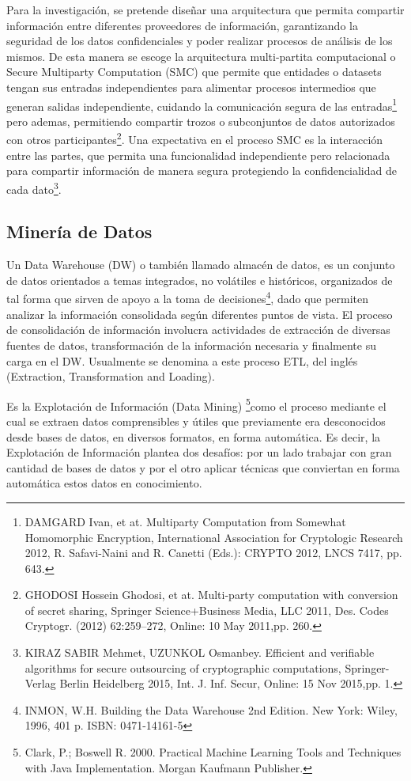 \documentclass[a4paper,openright,12pt]{book}
\theoremstyle{definition}
\theoremstyle{remark}
\begin{document}
Para la investigación, se pretende diseñar una arquitectura que permita compartir información entre diferentes proveedores de información, garantizando la seguridad de los datos confidenciales y poder realizar procesos de análisis de los mismos. De esta manera se escoge la arquitectura multi-partita computacional o Secure Multiparty Computation (SMC) que permite que entidades o datasets tengan sus entradas independientes para alimentar procesos intermedios que generan salidas independiente, cuidando la comunicación segura de las entradas\footnote{DAMGARD Ivan, et at. Multiparty Computation from Somewhat Homomorphic Encryption, International Association for Cryptologic Research 2012, R. Safavi-Naini and R. Canetti (Eds.): CRYPTO 2012, LNCS 7417, pp. 643.} pero ademas, permitiendo compartir trozos o subconjuntos de datos autorizados con otros participantes\footnote{GHODOSI Hossein Ghodosi, et at. Multi-party computation with conversion of secret sharing, Springer Science+Business Media, LLC 2011, Des. Codes Cryptogr. (2012) 62:259–272, Online: 10 May 2011,pp. 260.}. Una expectativa en el proceso SMC es la interacción entre las partes, que permita una funcionalidad independiente pero relacionada para compartir información de manera segura protegiendo la confidencialidad de cada dato\footnote{KIRAZ SABIR Mehmet, UZUNKOL Osmanbey. Efficient and verifiable algorithms for secure outsourcing of cryptographic computations, Springer-Verlag Berlin Heidelberg 2015, Int. J. Inf. Secur, Online: 15 Nov 2015,pp. 1.}.

	\subsection{Minería de Datos}
Un Data Warehouse (DW) o también llamado almacén de datos, es un conjunto de datos orientados a temas integrados, no volátiles e históricos, organizados de tal forma que sirven de apoyo a la toma de decisiones\footnote{INMON, W.H. Building the Data Warehouse 2nd Edition. New York: Wiley, 1996,
401 p. ISBN: 0471-14161-5}, dado que permiten analizar la información consolidada según diferentes puntos de vista. El proceso de consolidación de información involucra actividades
de extracción de diversas fuentes de datos, transformación de la información necesaria y finalmente su carga en el DW. Usualmente se denomina a este proceso ETL, del inglés (Extraction, Transformation and Loading).

Es la Explotación de Información (Data Mining) \footnote{Clark, P.; Boswell R. 2000. Practical Machine
Learning Tools and Techniques with Java
Implementation. Morgan Kaufmann Publisher.}como el proceso mediante el cual se extraen  datos comprensibles y útiles que previamente era desconocidos desde bases de datos, en diversos formatos, en forma automática. Es decir,
la Explotación de Información plantea dos desafíos: por un lado trabajar con gran cantidad de bases de datos y por el otro aplicar técnicas que conviertan en forma automática estos datos en conocimiento.
\end{document}
